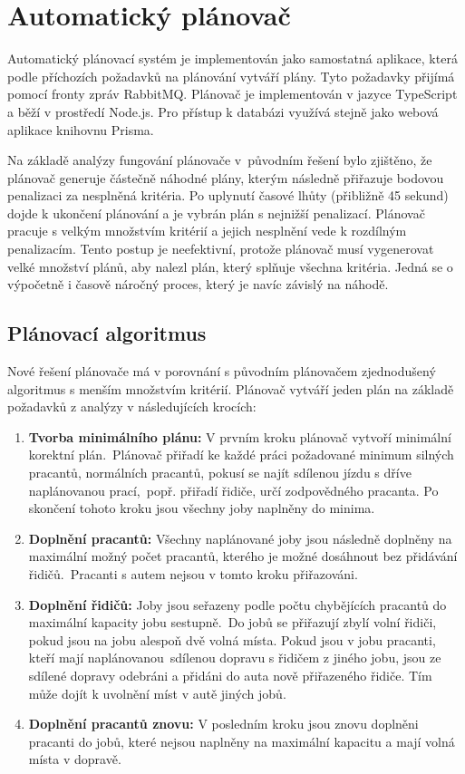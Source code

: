 \section{Automatický plánovač}

Automatický plánovací systém je implementován jako samostatná aplikace, která podle příchozích požadavků na plánování vytváří
plány. Tyto požadavky přijímá pomocí fronty zpráv RabbitMQ. Plánovač je implementován v jazyce TypeScript a běží v prostředí Node.js.
Pro přístup k databázi využívá stejně jako webová aplikace knihovnu Prisma.

Na základě analýzy fungování plánovače v~původním řešení bylo zjištěno, že plánovač generuje částečně náhodné plány, kterým následně přiřazuje
bodovou penalizaci za nesplněná kritéria. Po uplynutí časové lhůty (přibližně 45 sekund) dojde k ukončení plánování
a je vybrán plán s nejnižší penalizací. Plánovač pracuje s velkým množstvím kritérií a jejich nesplnění vede k rozdílným penalizacím.
Tento postup je neefektivní, protože plánovač musí vygenerovat velké množství plánů, aby
nalezl plán, který splňuje všechna kritéria. Jedná se o výpočetně i časově náročný proces, který je navíc závislý na náhodě.

\subsection{Plánovací algoritmus}

Nové řešení plánovače má v porovnání s původním plánovačem zjednodušený algoritmus s menším množstvím kritérií.
Plánovač vytváří jeden plán na základě požadavků z analýzy v následujících krocích:

\begin{enumerate}
    \item \textbf{Tvorba minimálního plánu:} V prvním kroku plánovač vytvoří minimální korektní plán.\ 
    Plánovač přiřadí ke každé práci požadované minimum silných pracantů, normálních pracantů, pokusí se najít sdílenou jízdu s dříve naplánovanou prací,\ 
    popř. přiřadí řidiče, určí zodpovědného pracanta. Po skončení tohoto kroku jsou všechny joby naplněny do minima. 
    \item \textbf{Doplnění pracantů:} Všechny naplánované joby jsou následně doplněny na maximální možný počet pracantů, kterého je možné dosáhnout bez přidávání řidičů.\ 
    Pracanti s autem nejsou v tomto kroku přiřazováni.
    \item \textbf{Doplnění řidičů:} Joby jsou seřazeny podle počtu chybějících pracantů do maximální kapacity jobu sestupně.\ 
    Do jobů se přiřazují zbylí volní řidiči, pokud jsou na jobu alespoň dvě volná místa. Pokud jsou v jobu pracanti, kteří mají naplánovanou\ 
    sdílenou dopravu s řidičem z jiného jobu, jsou ze sdílené dopravy odebráni a přidáni do auta nově přiřazeného řidiče. Tím může dojít k uvolnění míst v autě jiných jobů.
    \item \textbf{Doplnění pracantů znovu:} V posledním kroku jsou znovu doplněni pracanti do jobů, které nejsou naplněny na maximální kapacitu a mají volná místa v dopravě.
\end{enumerate}

